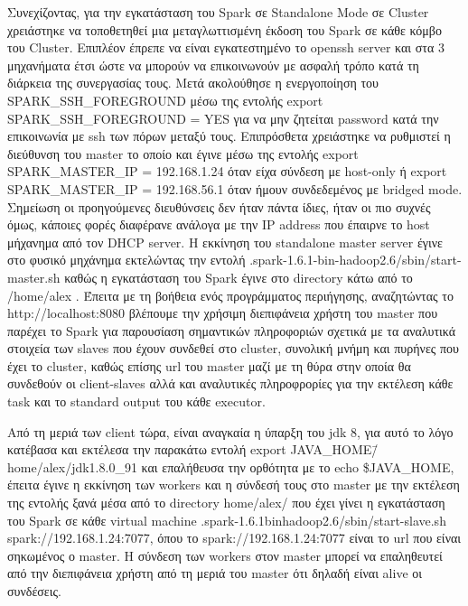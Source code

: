 \documentclass{report}
\begin{document}
Συνεχίζοντας, για την εγκατάσταση του \textlatin{Spark} σε \textlatin{Standalone Mode} σε  \textlatin{Cluster} χρειάστηκε να τοποθετηθεί μια μεταγλωττισμένη έκδοση του \textlatin{Spark} σε κάθε κόμβο του \textlatin{Cluster}. Επιπλέον έπρεπε να είναι εγκατεστημένο το \textlatin{openssh server} και στα 3 μηχανήματα έτσι ώστε να μπορούν να επικοινωνούν με ασφαλή τρόπο κατά τη διάρκεια της συνεργασίας τους. Μετά ακολούθησε η ενεργοποίηση του \textlatin{SPARK\_SSH\_FOREGROUND} μέσω της εντολής \textlatin{export SPARK\_SSH\_FOREGROUND = YES} για να μην ζητείται \textlatin{password} κατά την επικοινωνία με \textlatin{ssh} των πόρων μεταξύ τους. Επιπρόσθετα χρειάστηκε να ρυθμιστεί η διεύθυνση του \textlatin{master} το οποίο και έγινε μέσω της εντολής \textlatin{export SPARK\_MASTER\_IP = } 192.168.1.24 όταν είχα σύνδεση με \textlatin{host-only} ή \textlatin{export SPARK\_MASTER\_IP = } 192.168.56.1 όταν ήμουν συνδεδεμένος με \textlatin{bridged mode}. Σημείωση οι προηγούμενες διευθύνσεις δεν ήταν πάντα ίδιες, ήταν οι πιο συχνές όμως, κάποιες φορές διαφέρανε ανάλογα με την \textlatin{IP address} που έπαιρνε το \textlatin{host} μήχανημα από τον \textlatin{DHCP server}. Η εκκίνηση του \textlatin{standalone master server} έγινε στο φυσικό μηχάνημα εκτελώντας την εντολή \textlatin{.spark-1.6.1-bin-hadoop2.6/sbin/start-master.sh} καθώς η εγκατάσταση του \textlatin{Spark} έγινε στο \textlatin{directory} κάτω από το \textlatin{/home/alex} . Έπειτα με τη βοήθεια ενός προγράμματος περιήγησης, αναζητώντας το \textlatin{http://localhost:8080} βλέπουμε την χρήσιμη διεπιφάνεια χρήστη του \textlatin{master} που παρέχει το \textlatin{Spark} για παρουσίαση σημαντικών πληροφοριών σχετικά με τα αναλυτικά στοιχεία των \textlatin{slaves} που έχουν συνδεθεί στο \textlatin{cluster}, συνολική μνήμη και πυρήνες που έχει το \textlatin{cluster}, καθώς επίσης \textlatin{url} του \textlatin{master} μαζί με τη θύρα στην οποία θα συνδεθούν οι \textlatin{client-slaves} αλλά και αναλυτικές πληροφρορίες για την εκτέλεση κάθε \textlatin{task} και το \textlatin{standard output} του κάθε \textlatin{executor}.

Από τη μεριά των \textlatin{client} τώρα, είναι αναγκαία η ύπαρξη του \textlatin{jdk} 8, για αυτό το λόγο κατέβασα και εκτέλεσα την παρακάτω εντολή 	\textlatin{export JAVA\_HOME\=/home/alex/jdk1.8.0\_91} και επαλήθευσα την ορθότητα με το
 \textlatin{echo \$JAVA\_HOME}, έπειτα έγινε η εκκίνηση των \textlatin{workers} και η σύνδεσή τους στο \textlatin{master} με την εκτέλεση της εντολής ξανά μέσα από το \textlatin{directory home/alex/} που έχει γίνει η εγκατάσταση του \textlatin{Spark} σε κάθε \textlatin{virtual machine} \textlatin{.spark-1.6.1\-bin\-hadoop2.6/sbin/start-slave.sh spark://192.168.1.24:7077}, όπου το \textlatin{spark://192.168.1.24:7077} είναι το \textlatin{url} που είναι σηκωμένος ο \textlatin{master}. Η σύνδεση των \textlatin{workers} στον \textlatin{master} μπορεί να επαληθευτεί από την διεπιφάνεια χρήστη από τη μεριά του \textlatin{master} ότι δηλαδή είναι \textlatin{alive} οι συνδέσεις. 
\end{document}
